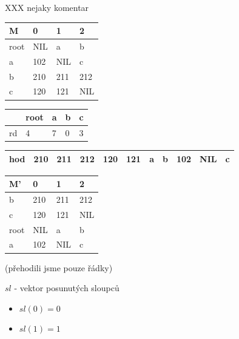 \begin{priklad}
XXX nejaky komentar \\

\vspace{5mm}

\begin{tabular}{|l|lll|}
\hline
M & 0 & 1 & 2 \\
\hline
root & NIL & a & b \\
a & 102 & NIL & c \\
b & 210 & 211 & 212 \\
c & 120 & 121 & NIL \\
\hline
\end{tabular}

\vspace{5mm}

\begin{tabular}{|l|llll|}
\hline
    & root & a & b & c \\
\hline
rd  &    4 & 7 & 0 & 3 \\
\hline
\end{tabular}

\vspace{3mm}

\begin{tabular}{|l|llllllllll|}
\hline
hod & 210 & 211 & 212 & 120 & 121 & a & b & 102 & NIL & c \\
\hline
\end{tabular}

\vspace{3mm}

\begin{tabular}{|l|lll|}
\hline
M' & 0 & 1 & 2 \\
\hline
b & 210 & 211 & 212 \\
c & 120 & 121 & NIL \\
root & NIL & a & b \\
a & 102 & NIL & c \\
\hline
\end{tabular}

\hspace{3mm}

(přehodili jsme pouze řádky)

$sl$ - vektor posunutých sloupců

\begin{itemize}
\item $sl(0) = 0$
\item $sl(1) = 1$
\end{itemize}


\end{priklad}
